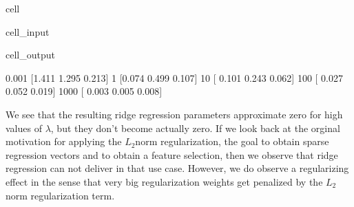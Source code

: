 \documentclass[letterpaper,10pt,english]{jupyterBook}
\begin{document}
\begin{sphinxuseclass}{cell}\begin{sphinxVerbatimInput}

\begin{sphinxuseclass}{cell_input}
\begin{sphinxVerbatim}[commandchars=\\\{\}]
   \PYG{p}{[}  \PYG{p}{]}
        
\end{sphinxVerbatim}

\end{sphinxuseclass}\end{sphinxVerbatimInput}
\begin{sphinxVerbatimOutput}

\begin{sphinxuseclass}{cell_output}
\begin{sphinxVerbatim}[commandchars=\\\{\}]
0.001 	 [\PYGZhy{}1.411  1.295 \PYGZhy{}0.213]
1 	 [\PYGZhy{}0.074  0.499 \PYGZhy{}0.107]
10 	 [ 0.101  0.243 \PYGZhy{}0.062]
100 	 [ 0.027  0.052 \PYGZhy{}0.019]
1000 	 [ 0.003  0.005 \PYGZhy{}0.008]
\end{sphinxVerbatim}

\end{sphinxuseclass}\end{sphinxVerbatimOutput}

\end{sphinxuseclass}
\sphinxAtStartPar
We see that the resulting ridge regression parameters approximate zero for high values of \(\lambda\), but they don’t become actually zero. If we look back at the orginal motivation for applying the \(L_2\)\sphinxhyphen{}norm regularization, the goal to obtain sparse regression vectors and to obtain a feature selection, then we observe that ridge regression can not deliver in that use case. However, we do observe a regularizing effect in the sense that very big regularization weights get penalized by the \(L_2\)\sphinxhyphen{}norm regularization term.
\end{document}
